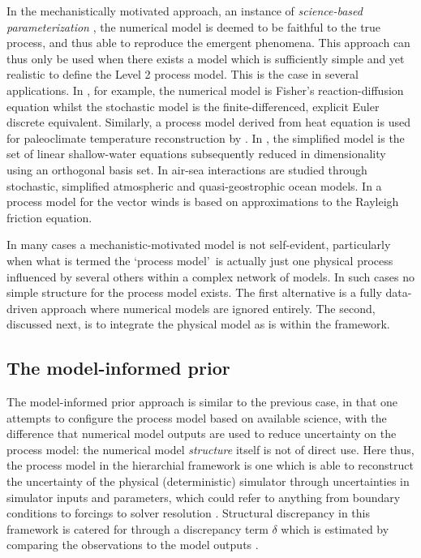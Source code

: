\documentclass[10pt,a4paper]{article}
\begin{document}
In the mechanistically motivated approach, an instance of \emph{science-based parameterization} \citep{Leeds_2012}, the numerical model is deemed to be faithful to the true process, and thus able to reproduce the emergent phenomena. This approach can thus only be used when there exists a model which is sufficiently simple and yet realistic to define the Level 2 process model. This is the case in several applications.  In \cite{Hooten_2008}, for example, the numerical model is Fisher's reaction-diffusion equation whilst the stochastic model is the finite-differenced, explicit Euler discrete equivalent. Similarly, a process model derived from heat equation is used for paleoclimate temperature reconstruction by \cite{Brynjarsdottir_2011}. In \cite{Wikle_2001}, the simplified model is the set of linear shallow-water equations subsequently reduced in dimensionality using an orthogonal basis set. In \cite{Berliner_2003b} air-sea interactions are studied through stochastic, simplified atmospheric and quasi-geostrophic ocean models. In \cite{Milliff_2011} a process model for the vector winds is based on approximations to the Rayleigh friction equation. 


In many cases a mechanistic-motivated model is not self-evident, particularly when what is termed the \lq process model\rq~is actually just one physical process influenced by several others within a complex network of models. In such cases no simple structure for the process model exists. The first alternative is a fully data-driven approach where numerical models are ignored entirely. The second, discussed next, is to integrate the physical model as is within the framework.


\subsection{The model-informed prior}\label{sec:mip}

The model-informed prior approach is similar to the previous case, in that one attempts to configure the process model based on available science, with the difference that numerical model outputs are used to reduce uncertainty on the process model: the numerical model \emph{structure} itself is not of direct use.  Here thus, the process model in the hierarchial framework is one which is able to reconstruct the uncertainty of the physical (deterministic) simulator through uncertainties in simulator inputs and parameters, which could refer to anything from boundary conditions to forcings to solver resolution \citep{Goldstein_2009}. Structural discrepancy in this framework is catered for through a discrepancy term $\delta$ which is estimated by comparing the observations to the model outputs \citep{Kennedy_2001}.
\end{document}
